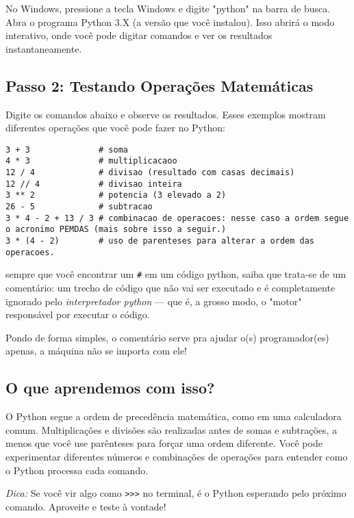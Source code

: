 \documentclass[12pt]{book}
\begin{document}
	No Windows, pressione a tecla Windows e digite "python" na barra de busca. Abra o programa Python 3.X (a versão que você instalou). Isso abrirá o modo interativo, onde você pode digitar comandos e ver os resultados instantaneamente.
	\subsection{Passo 2: Testando Operações Matemáticas}
	
	Digite os comandos abaixo e observe os resultados. Esses exemplos mostram diferentes operações que você pode fazer no Python:
	\begin{lstlisting}[caption={Python como calculadora.}]
3 + 3              # soma
4 * 3              # multiplicacaoo
12 / 4             # divisao (resultado com casas decimais)
12 // 4            # divisao inteira
3 ** 2             # potencia (3 elevado a 2)
26 - 5             # subtracao
3 * 4 - 2 + 13 / 3 # combinacao de operacoes: nesse caso a ordem segue o acronimo PEMDAS (mais sobre isso a seguir.)
3 * (4 - 2)        # uso de parenteses para alterar a ordem das operacoes.\end{lstlisting}
	
	\begin{tcolorbox}[colback=gray!10, colframe=black, title={\large\bfseries Observação}]
		sempre que você encontrar um \texttt{\#} em um código python, saiba que trata-se de um comentário: um trecho de código que não vai ser executado e é completamente ignorado pelo \textit{interpretador python} --- que é, a grosso modo, o "motor" responsável por executar o código.
		
		Pondo de forma simples, o comentário serve pra ajudar o(s) programador(es) apenas, a máquina não se importa com ele!
	\end{tcolorbox}
	\subsection{O que aprendemos com isso?}
	
	O Python segue a ordem de precedência matemática, como em uma calculadora comum. Multiplicações e divisões são realizadas antes de somas e subtrações, a menos que você use parênteses para forçar uma ordem diferente.\newline
	Você pode experimentar diferentes números e combinações de operações para entender como o Python processa cada comando.
	
	\textit{Dica:} Se você vir algo como \texttt{>{>}>} no terminal, é o Python esperando pelo próximo comando. Aproveite e teste à vontade!
	
\end{document}
